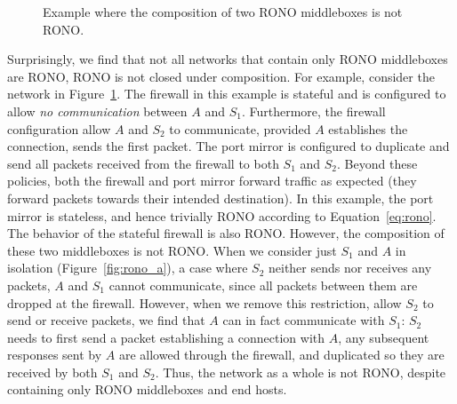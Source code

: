 \begin{figure}[t]
\centering
{}

\caption{Example where the composition of two RONO middleboxes is not RONO.}
\label{fig:rono_fail}
\vspace{-0.15in}
\end{figure}

Surprisingly, we find that not all networks that contain only RONO middleboxes are RONO, \ie RONO is not closed under composition. For example, consider the network in Figure~\ref{fig:rono_fail}. The firewall in this example is stateful and is configured to allow \emph{no communication} between $A$ and $S_1$. Furthermore, the firewall configuration allow $A$ and $S_2$ to communicate, provided $A$ establishes the connection, \ie sends the first packet. The port mirror is configured to duplicate and send all packets received from the firewall to both $S_1$ and $S_2$. Beyond these policies, both the firewall and port mirror forward traffic as expected (\ie they forward packets towards their intended destination). In this example, the port mirror is stateless, and hence trivially RONO according to Equation~\ref{eq:rono}. The behavior of the stateful firewall is also RONO. However, the composition of these two middleboxes is not RONO. When we consider just $S_1$ and $A$ in isolation (Figure~\ref{fig:rono_a}), \ie a case where $S_2$ neither sends nor receives any packets, $A$ and $S_1$ cannot communicate, since all packets between them are dropped at the firewall. However, when we remove this restriction, \ie allow $S_2$ to send or receive packets, we find that $A$ can in fact communicate with $S_1$: $S_2$ needs to first send a packet establishing a connection with $A$, any subsequent responses sent by $A$ are allowed through the firewall, and duplicated so they are received by both $S_1$ and $S_2$. Thus, the network as a whole is not RONO, despite containing only RONO middleboxes and end hosts.
\cbend

